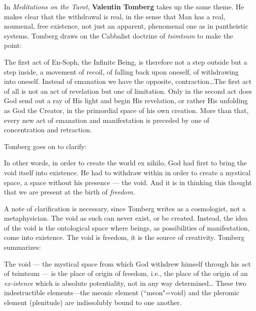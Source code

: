 In \emph{Meditations on the Tarot}, \textbf{Valentin Tomberg} takes up the same theme. He makes clear that the withdrawal is real, in the sense that Man has a real, noumenal, free existence, not just an apparent, phenomenal one as in pantheistic systems. Tomberg draws on the Cabbalist doctrine of \emph{tsimtsum} to make the point:

\begin{quotex}
The first act of En-Soph, the Infinite Being, is therefore not a step outside but a step inside, a movement of recoil, of falling back upon oneself, of withdrawing into oneself. Instead of emanation we have the opposite, contraction…The first act of all is not an act of revelation but one of limitation. Only in the second act does God send out a ray of His light and begin His revelation, or rather His unfolding as God the Creator, in the primordial space of his own creation. More than that, every new act of emanation and manifestation is preceded by one of concentration and retraction. 

\end{quotex}
Tomberg goes on to clarify:

\begin{quotex}
In other words, in order to create the world ex nihilo, God had first to bring the void itself into existence. He had to withdraw within in order to create a mystical space, a space without his presence — the void. And it is in thinking this thought that we are present at the birth of \emph{freedom}. 

\end{quotex}
A note of clarification is necessary, since Tomberg writes as a cosmologist, not a metaphysician. The void as such can never exist, or be created. Instead, the idea of the void is the ontological space where beings, as possibilities of manifestation, come into existence. The void is freedom, it is the source of creativity. Tomberg summarizes:

\begin{quotex}
The void — the mystical space from which God withdrew himself through his act of tsimtsum — is the place of origin of freedom, i.e., the place of the origin of an \emph{ex-istence} which is absolute potentiality, not in any way determined… These two indestructible elements—the meonic element (``meon"=void) and the pleromic element (plenitude) are indissolubly bound to one another.

\end{quotex}

